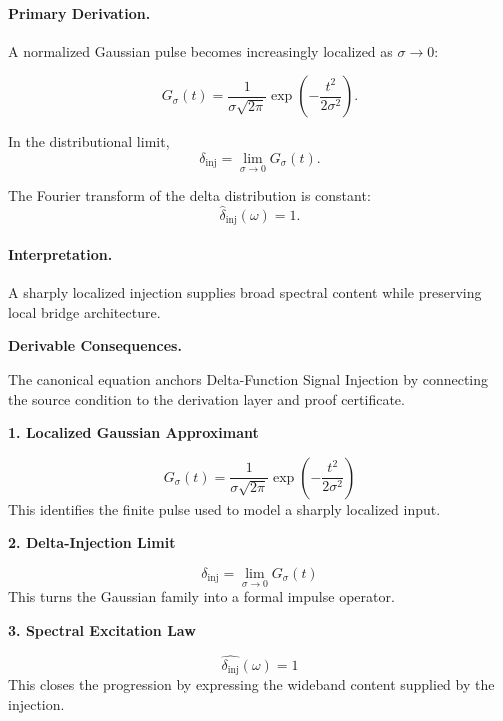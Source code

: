 \paragraph{Primary Derivation.}
A normalized Gaussian pulse becomes increasingly localized as $\sigma\to0$:

\begin{equation}
G_{\sigma}(t)
=
\frac{1}{\sigma\sqrt{2\pi}}
\exp\left(
-\frac{t^2}{2\sigma^2}
\right).
\end{equation}

In the distributional limit,
\begin{equation}
\delta_{\mathrm{inj}}
=
\lim_{\sigma\to0}G_{\sigma}(t).
\end{equation}

The Fourier transform of the delta distribution is constant:
\begin{equation}
\boxed{
\widehat{\delta}_{\mathrm{inj}}(\omega)=1.
}
\end{equation}

\paragraph{Interpretation.}
A sharply localized injection supplies broad spectral content while preserving local bridge architecture.

\par\vspace{0.35em}
\noindent\textbf{Derivable Consequences.}\quad
\begingroup
\footnotesize
\raggedright
The canonical equation anchors Delta-Function Signal Injection by connecting the source condition to the derivation layer and proof certificate.
\par\endgroup

\noindent\textbf{1. Localized Gaussian Approximant}\par
\[
G_{\sigma}(t)
=
\frac{1}{\sigma\sqrt{2\pi}}
\exp\!\left(-\frac{t^2}{2\sigma^2}\right)
\]
\noindent This identifies the finite pulse used to model a sharply localized input.\par
\noindent\textbf{2. Delta-Injection Limit}\par
\[
\delta_{\mathrm{inj}} = \lim_{\sigma \to 0} G_{\sigma}(t)
\]
\noindent This turns the Gaussian family into a formal impulse operator.\par
\noindent\textbf{3. Spectral Excitation Law}\par
\[
\widehat{\delta_{\mathrm{inj}}}(\omega) = 1
\]
\noindent This closes the progression by expressing the wideband content supplied by the injection.\par

